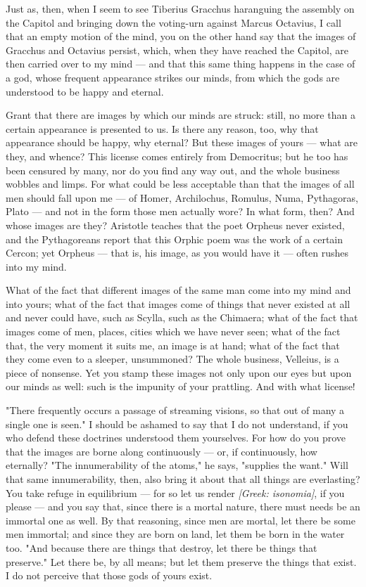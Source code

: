  Just as, then, when I seem to see Tiberius Gracchus haranguing the assembly on the Capitol and bringing down the voting-urn against Marcus Octavius, I call that an empty motion of the mind, you on the other hand say that the images of Gracchus and Octavius persist, which, when they have reached the Capitol, are then carried over to my mind — and that this same thing happens in the case of a god, whose frequent appearance strikes our minds, from which the gods are understood to be happy and eternal.

 Grant that there are images by which our minds are struck: still, no more than a certain appearance is presented to us. Is there any reason, too, why that appearance should be happy, why eternal? But these images of yours — what are they, and whence? This license comes entirely from Democritus; but he too has been censured by many, nor do you find any way out, and the whole business wobbles and limps. For what could be less acceptable than that the images of all men should fall upon me — of Homer, Archilochus, Romulus, Numa, Pythagoras, Plato — and not in the form those men actually wore? In what form, then? And whose images are they? Aristotle teaches that the poet Orpheus never existed, and the Pythagoreans report that this Orphic poem was the work of a certain Cercon; yet Orpheus — that is, his image, as you would have it — often rushes into my mind.

 What of the fact that different images of the same man come into my mind and into yours; what of the fact that images come of things that never existed at all and never could have, such as Scylla, such as the Chimaera; what of the fact that images come of men, places, cities which we have never seen; what of the fact that, the very moment it suits me, an image is at hand; what of the fact that they come even to a sleeper, unsummoned? The whole business, Velleius, is a piece of nonsense. Yet you stamp these images not only upon our eyes but upon our minds as well: such is the impunity of your prattling. And with what license!

 "There frequently occurs a passage of streaming visions, so that out of many a single one is seen." I should be ashamed to say that I do not understand, if you who defend these doctrines understood them yourselves. For how do you prove that the images are borne along continuously — or, if continuously, how eternally? "The innumerability of the atoms," he says, "supplies the want." Will that same innumerability, then, also bring it about that all things are everlasting? You take refuge in equilibrium — for so let us render \textit{[Greek: isonomia]}, if you please — and you say that, since there is a mortal nature, there must needs be an immortal one as well. By that reasoning, since men are mortal, let there be some men immortal; and since they are born on land, let them be born in the water too. "And because there are things that destroy, let there be things that preserve." Let there be, by all means; but let them preserve the things that exist. I do not perceive that those gods of yours exist.

